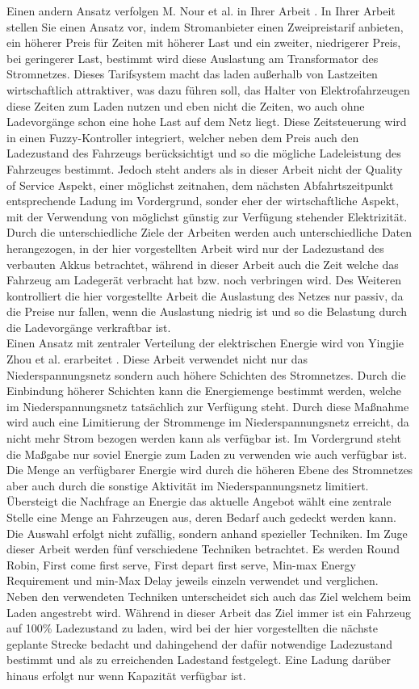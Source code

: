 Einen andern Ansatz verfolgen M. Nour et al. in Ihrer Arbeit \cite{RW_2_1}. In Ihrer Arbeit stellen Sie einen Ansatz vor, indem Stromanbieter einen Zweipreistarif anbieten, ein höherer Preis für Zeiten mit höherer Last und ein zweiter, niedrigerer Preis, bei geringerer Last, bestimmt wird diese Auslastung am Transformator des Stromnetzes. Dieses Tarifsystem macht das laden außerhalb von Lastzeiten wirtschaftlich attraktiver, was dazu führen soll, das Halter von Elektrofahrzeugen diese Zeiten zum Laden nutzen und eben nicht die Zeiten, wo auch ohne Ladevorgänge schon eine hohe Last auf dem Netz liegt. Diese Zeitsteuerung wird in einen Fuzzy-Kontroller integriert, welcher neben dem Preis auch den Ladezustand des Fahrzeugs berücksichtigt und so die mögliche Ladeleistung des Fahrzeuges bestimmt. Jedoch steht anders als in dieser Arbeit nicht der Quality of Service Aspekt, einer möglichst zeitnahen,  dem nächsten Abfahrtszeitpunkt entsprechende Ladung im Vordergrund, sonder eher der wirtschaftliche Aspekt, mit der Verwendung von möglichst günstig zur Verfügung stehender Elektrizität. Durch die unterschiedliche Ziele der Arbeiten werden auch unterschiedliche Daten herangezogen, in der hier vorgestellten Arbeit wird nur der Ladezustand des verbauten Akkus betrachtet, während in dieser Arbeit auch die Zeit welche das Fahrzeug am Ladegerät verbracht hat bzw. noch verbringen wird. Des Weiteren kontrolliert die hier vorgestellte Arbeit die Auslastung des Netzes nur passiv, da die Preise nur fallen, wenn die Auslastung niedrig ist und so die Belastung durch die Ladevorgänge verkraftbar ist.\\
Einen Ansatz mit zentraler Verteilung der elektrischen Energie wird von Yingjie Zhou et al. erarbeitet \cite{RWcentral}. Diese Arbeit verwendet nicht nur das Niederspannungsnetz sondern auch höhere Schichten des Stromnetzes. Durch die Einbindung höherer Schichten kann die Energiemenge bestimmt werden, welche im Niederspannungsnetz tatsächlich zur Verfügung steht. Durch diese Maßnahme wird auch eine Limitierung der Strommenge im Niederspannungsnetz erreicht, da nicht mehr Strom bezogen werden kann als verfügbar ist. Im Vordergrund steht die Maßgabe nur soviel Energie zum Laden zu verwenden wie auch verfügbar ist. Die Menge an verfügbarer Energie wird durch die höheren Ebene des Stromnetzes aber auch durch die sonstige Aktivität im Niederspannungsnetz limitiert. Übersteigt die Nachfrage an Energie das aktuelle Angebot wählt eine zentrale Stelle eine Menge an Fahrzeugen aus, deren Bedarf auch gedeckt werden kann. Die Auswahl erfolgt nicht zufällig, sondern anhand spezieller Techniken. Im Zuge dieser Arbeit werden fünf verschiedene Techniken betrachtet. Es werden Round Robin, First come first serve, First depart first serve, Min-max Energy Requirement und min-Max Delay jeweils einzeln verwendet und verglichen. Neben den verwendeten Techniken unterscheidet sich auch das Ziel welchem beim Laden angestrebt wird. Während in dieser Arbeit das Ziel immer ist ein Fahrzeug auf 100\% Ladezustand zu laden, wird bei der hier vorgestellten die nächste geplante Strecke bedacht und dahingehend der dafür notwendige Ladezustand bestimmt und als zu erreichenden Ladestand festgelegt. Eine Ladung darüber hinaus erfolgt nur wenn Kapazität verfügbar ist.




